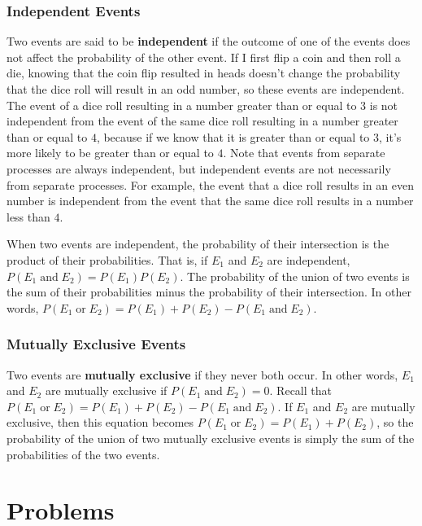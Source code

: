 \documentclass[twocolumn]{article}
\newcommand{\pand}{\mathop\text{and}}
\newcommand{\por}{\mathop\text{or}}
\begin{document}
\subsubsection*{Independent Events}
Two events are said to be \textbf{independent} if the outcome of one of the
events does not affect the probability of the other event. If I first flip a
coin and then roll a die, knowing that the coin flip resulted in heads doesn't
change the probability that the dice roll will result in an odd number, so these
events are independent. The event of a dice roll resulting in a number greater
than or equal to $3$ is not independent from the event of the same dice roll
resulting in a number greater than or equal to $4$, because if we know that it
is greater than or equal to $3$, it's more likely to be greater than or equal to
$4$. Note that events from separate processes are always independent, but
independent events are not necessarily from separate processes. For example, the
event that a dice roll results in an even number is independent from the event
that the same dice roll results in a number less than $4$.

When two events are independent, the probability of their intersection is the
product of their probabilities. That is, if $E_1$ and $E_2$ are independent,
$P(E_1 \pand E_2) = P(E_1)P(E_2)$. The probability of the union of two events is
the sum of their probabilities minus the probability of their intersection. In
other words, $P(E_1 \por E_2) = P(E_1) + P(E_2) - P(E_1 \pand E_2)$.

\subsubsection*{Mutually Exclusive Events}
Two events are \textbf{mutually exclusive} if they never both occur. In other
words, $E_1$ and $E_2$ are mutually exclusive if $P(E_1 \pand E_2) = 0$. Recall
that $P(E_1 \por E_2) = P(E_1) + P(E_2) - P(E_1 \pand E_2)$. If $E_1$ and $E_2$
are mutually exclusive, then this equation becomes $P(E_1 \por E_2) = P(E_1) +
P(E_2)$, so the probability of the union of two mutually exclusive events is
simply the sum of the probabilities of the two events.

\section*{Problems}
\end{document}
